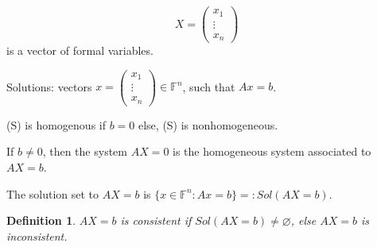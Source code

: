 \documentclass[12pt]{article}
\theoremstyle{plain}
\newtheorem{definition}{Definition}[subsection]
\newcommand{\mF}{{\mathbb{F}}}
\begin{document}
\[
	X = 
	\begin{pmatrix}
		x_1		\\
		\vdots	\\
		x_n
	\end{pmatrix}
\]
is a vector of formal variables. 

Solutions: vectors $x = \begin{pmatrix}x_1 \\ \vdots \\ x_n \end{pmatrix} \in
\mF^n$, such that $Ax = b$. 

(S) is homogenous if $b = 0$ else, (S) is nonhomogeneous. 

If $b\neq 0$, then the system $AX = 0$ is the homogeneous system associated to
$AX = b$. 

The solution set to $AX = b$ is $\{x \in \mF^n : Ax = b\} =: Sol(AX=b)$. \\

\begin{definition}
	$AX = b$ is consistent if $Sol(AX=b) \neq \varnothing$, else $AX=b$ is 
	inconsistent. \\
\end{definition}
\end{document}
